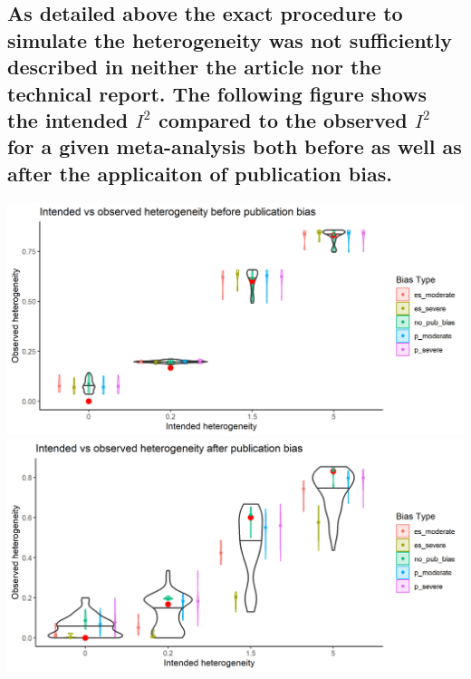 \documentclass[
  english,
  doc,floatsintext,draftall]{apa6}
\begin{document}
\hypertarget{as-detailed-above-the-exact-procedure-to-simulate-the-heterogeneity-was-not-sufficiently-described-in-neither-the-article-nor-the-technical-report.-the-following-figure-shows-the-intended-i2-compared-to-the-observed-i2-for-a-given-meta-analysis-both-before-as-well-as-after-the-applicaiton-of-publication-bias.}{%
\subsection{\texorpdfstring{As detailed above the exact procedure to simulate the heterogeneity was not sufficiently described in neither the article nor the technical report. The following figure shows the intended \(I^2\) compared to the observed \(I^2\) for a given meta-analysis both before as well as after the applicaiton of publication bias.}{As detailed above the exact procedure to simulate the heterogeneity was not sufficiently described in neither the article nor the technical report. The following figure shows the intended I\^{}2 compared to the observed I\^{}2 for a given meta-analysis both before as well as after the applicaiton of publication bias.}}\label{as-detailed-above-the-exact-procedure-to-simulate-the-heterogeneity-was-not-sufficiently-described-in-neither-the-article-nor-the-technical-report.-the-following-figure-shows-the-intended-i2-compared-to-the-observed-i2-for-a-given-meta-analysis-both-before-as-well-as-after-the-applicaiton-of-publication-bias.}}

\includegraphics{../figures/i_squared_unbiased.png}
\includegraphics{../figures/i_squared_biased.png}
\end{document}
